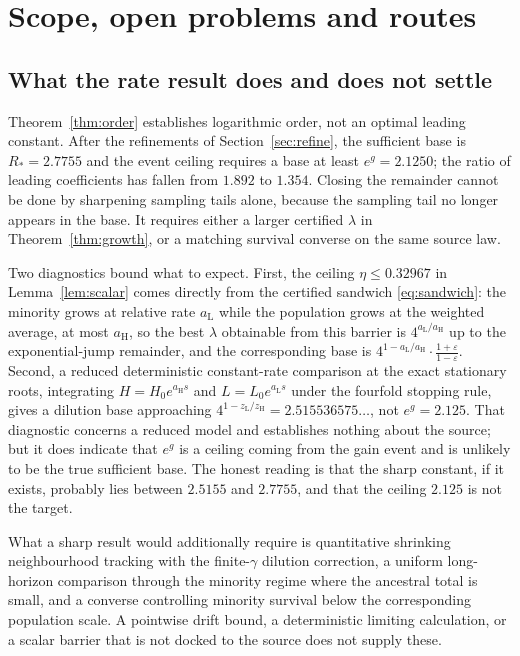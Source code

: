 \documentclass[11pt,a4paper]{article}
\theoremstyle{plain}
\theoremstyle{definition}
\theoremstyle{remark}
\newcommand{\eps}{\varepsilon}
\newcommand{\lo}{\mathrm L}
\newcommand{\hi}{\mathrm H}
\begin{document}
\section{Scope, open problems and routes}\label{sec:scope}

\subsection{What the rate result does and does not settle}

Theorem~\ref{thm:order} establishes logarithmic order, not an optimal leading
constant. After the refinements of Section~\ref{sec:refine}, the sufficient
base is $R_*=2.7755$ and the event ceiling requires a base at least
$e^g=2.1250$; the ratio of leading coefficients has fallen from $1.892$ to
$1.354$. Closing the remainder cannot be done by sharpening sampling tails
alone, because the sampling tail no longer appears in the base. It requires
either a larger certified $\lambda$ in Theorem~\ref{thm:growth}, or a matching
survival converse on the same source law.

Two diagnostics bound what to expect. First, the ceiling $\eta\le0.32967$ in
Lemma~\ref{lem:scalar} comes directly from the certified sandwich
\eqref{eq:sandwich}: the minority grows at relative rate $a_\lo$ while the
population grows at the weighted average, at most $a_\hi$, so the best
$\lambda$ obtainable from this barrier is $4^{a_\lo/a_\hi}$ up to the
exponential-jump remainder, and the corresponding base is
$4^{1-a_\lo/a_\hi}\cdot\frac{1+\eps}{1-\eps}$. Second, a reduced deterministic
constant-rate comparison at the exact stationary roots, integrating
$H=H_0e^{a_\hi s}$ and $L=L_0e^{a_\lo s}$ under the fourfold stopping rule,
gives a dilution base approaching
$4^{1-z_\lo/z_\hi}=2.515536575\ldots$, not $e^g=2.125$. That diagnostic
concerns a reduced model and establishes nothing about the source; but it does
indicate that $e^g$ is a ceiling coming from the gain event and is unlikely to
be the true sufficient base. The honest reading is that the sharp constant, if
it exists, probably lies between $2.5155$ and $2.7755$, and that the ceiling
$2.125$ is not the target.

What a sharp result would additionally require is quantitative shrinking
neighbourhood tracking with the finite-$\gamma$ dilution correction, a uniform
long-horizon comparison through the minority regime where the ancestral total
is small, and a converse controlling minority survival below the corresponding
population scale. A pointwise drift bound, a deterministic limiting
calculation, or a scalar barrier that is not docked to the source does not
supply these.
\end{document}
